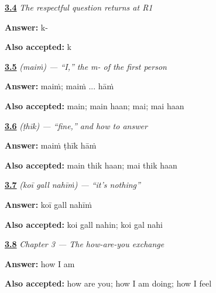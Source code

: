 \noindent\begin{minipage}[t]{\linewidth}
\raggedright
\hyperlink{review-PA-R03-wellbeing-r1-question-k}{\textbf{3.4}} \emph{The respectful question returns at R1}\par
\small \textbf{Answer:} k-\par
\footnotesize \textbf{Also accepted:} k
\end{minipage}\par\medskip

\noindent\begin{minipage}[t]{\linewidth}
\raggedright
\hyperlink{review-PA-C03-main-pair}{\textbf{3.5}} \emph{ (maiṁ) — \textquotedblleft{}I,\textquotedblright{} the m- of the first person}\par
\small \textbf{Answer:} maiṁ; maiṁ ... hāṁ\par
\footnotesize \textbf{Also accepted:} main; main haan; mai; mai haan
\end{minipage}\par\medskip

\noindent\begin{minipage}[t]{\linewidth}
\raggedright
\hyperlink{review-PA-C03-thik-reply}{\textbf{3.6}} \emph{ (ṭhīk) — \textquotedblleft{}fine,\textquotedblright{} and how to answer}\par
\small \textbf{Answer:} maiṁ ṭhīk hāṁ\par
\footnotesize \textbf{Also accepted:} main thik haan; mai thik haan
\end{minipage}\par\medskip

\noindent\begin{minipage}[t]{\linewidth}
\raggedright
\hyperlink{review-PA-C03-koi-gall-nahin-response}{\textbf{3.7}} \emph{   (koī gall nahīṁ) — \textquotedblleft{}it's nothing\textquotedblright{}}\par
\small \textbf{Answer:} koī gall nahīṁ\par
\footnotesize \textbf{Also accepted:} koi gall nahin; koi gal nahi
\end{minipage}\par\medskip

\noindent\begin{minipage}[t]{\linewidth}
\raggedright
\hyperlink{review-PA-C03-practice-listening}{\textbf{3.8}} \emph{Chapter 3 — The how-are-you exchange}\par
\small \textbf{Answer:} how I am\par
\footnotesize \textbf{Also accepted:} how are you; how I am doing; how I feel
\end{minipage}\par\medskip

